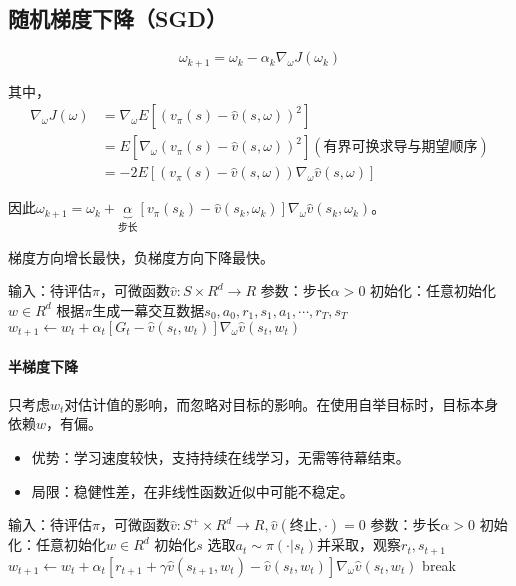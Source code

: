 \documentclass[
12pt, %
a4paper, 
oneside, %
headinclude,footinclude, %
]{scrartcl}
\begin{document}
\subsection[随机梯度下降]{随机梯度下降（SGD）}
$$ \omega_{k + 1} = \omega_k - \alpha_k \nabla_\omega J(\omega_k) $$

其中，
\begin{align*}
\nabla_\omega J(\omega)
&= \nabla_\omega E[(v_\pi(s) - \hat{v}(s, \omega))^2] \\
&= E[\nabla_\omega (v_\pi(s) - \hat{v}(s, \omega))^2] (\text{有界可换求导与期望顺序}) \\
&= -2E[(v_\pi(s) - \hat{v}(s, \omega)) \nabla_\omega \hat{v}(s, \omega)]
\end{align*}

因此$ \omega_{k + 1} = \omega_k + \underbrace{\alpha}_{\text{步长}}[v_\pi(s_k) - \hat{v}(s_k, \omega_k)]\nabla_\omega \hat{v}(s_k, \omega_k) $。

梯度方向增长最快，负梯度方向下降最快。
\begin{myalgorithm}[梯度MC]
\State 输入：待评估$ \pi $，可微函数$ \hat{v}:S \times R^d \to R $
\State 参数：步长$ \alpha > 0 $
\State 初始化：任意初始化$ w \in R^d $
\Loop {}
\State 根据$ \pi $生成一幕交互数据$ s_0, a_0, r_1, s_1, a_1, \cdots, r_T, s_T $
\State $ w_{t + 1} \gets w_t + \alpha_t[G_t - \hat{v}(s_t, w_t)]\nabla_{\omega} \hat{v}(s_t, w_t)$
\EndFor
\EndLoop
\end{myalgorithm}
\paragraph{半梯度下降}
只考虑$ w_t $对估计值的影响，而忽略对目标的影响。在使用自举目标时，目标本身依赖$ w $，有偏。
\begin{itemize}
\item 优势：学习速度较快，支持持续在线学习，无需等待幕结束。
\item 局限：稳健性差，在非线性函数近似中可能不稳定。
\end{itemize}
\begin{myalgorithm}[半梯度TD($ 0 $)]
\State 输入：待评估$ \pi $，可微函数$ \hat{v}:S^+ \times R^d \to R, \hat{v}(\text{终止}, \cdot) = 0 $
\State 参数：步长$ \alpha > 0 $
\State 初始化：任意初始化$ w \in R^d $
\Loop {}
\State 初始化$ s $
\State 选取$ a_t \sim \pi(\cdot|s_t) $并采取，观察$ r_t, s_{t + 1} $
\State $ w_{t + 1} \gets w_t + \alpha_t[r_{t + 1} + \gamma\hat{v}(s_{t + 1}, w_t) - \hat{v}(s_t, w_t)]\nabla_{\omega} \hat{v}(s_t, w_t) $
\State break
\EndIf
\EndFor
\EndLoop
\end{myalgorithm}
\end{document}
